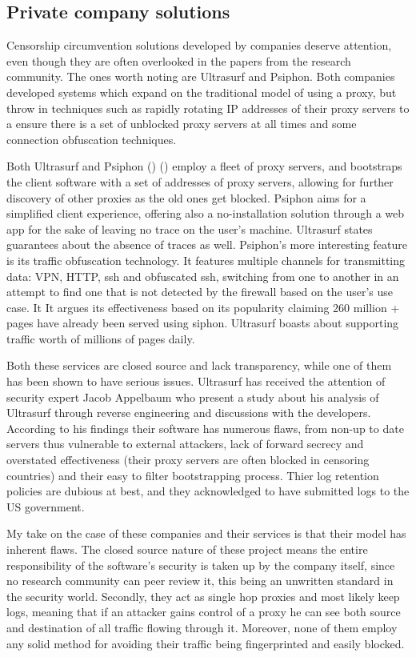 \documentclass[11pt]{book} %
\begin{document}
\subsection{Private company solutions}
Censorship circumvention solutions developed by companies deserve attention, even though they are often overlooked in the papers from the research community. The ones worth noting are Ultrasurf and Psiphon. Both companies developed systems which expand on the traditional model of using a proxy, but throw in techniques such as rapidly rotating IP addresses of their proxy servers to a ensure there is a set of unblocked proxy servers at all times and some connection obfuscation techniques.

Both Ultrasurf and Psiphon (\citep*{ultrareach}) (\citep*{psiphon}) employ a fleet of proxy servers, and bootstraps the client software with a set of addresses of proxy servers, allowing for further discovery of other proxies as the old ones get blocked. Psiphon aims for a simplified client experience, offering also a no-installation solution through a web app for the sake of leaving no trace on the user’s machine. Ultrasurf states guarantees about the absence of traces as well. Psiphon’s  more interesting feature is its traffic obfuscation technology. It features multiple channels for transmitting data: VPN, HTTP, ssh and obfuscated ssh, switching from one to another in an attempt to find one that is not detected by the firewall based on the user’s use case.  It It argues its effectiveness based on its popularity claiming 260 million + pages have already been served using siphon. Ultrasurf boasts about supporting traffic worth of millions of pages daily.

Both these services are closed source and lack transparency, while one of them has been shown to have serious issues. Ultrasurf has received the attention of security expert Jacob Appelbaum who present a study \citep*{ultrasurfSucks} about his analysis of Ultrasurf through reverse engineering and discussions with the developers. According to his findings their software has numerous flaws, from non-up to date servers thus vulnerable to external attackers, lack of forward secrecy and overstated effectiveness (their proxy servers are often blocked in censoring countries) and their easy to filter bootstrapping process. Thier log retention policies are dubious at best, and they acknowledged to have submitted logs to the US government. 

My take on the case of these companies and their services is that their model has inherent flaws.  The closed source nature of these project means the entire responsibility of the software’s security is taken up by the company itself, since no research community can peer review it, this being an unwritten standard in the security world. Secondly, they act as single hop proxies and most likely keep logs, meaning that if an attacker gains control of a proxy he can see both source and destination of all traffic flowing through it. Moreover, none of them employ any solid method for avoiding their traffic being fingerprinted and easily blocked.
\end{document}
